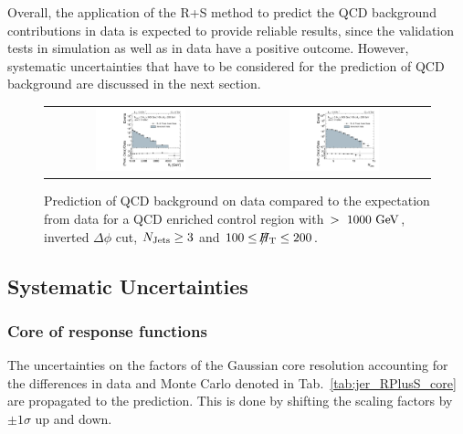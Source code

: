 Overall, the application of the R+S method to predict the QCD background contributions in data is expected to provide reliable results, since the validation tests in simulation as well as in data have a positive outcome. However, systematic uncertainties that have to be considered for the prediction of QCD background are discussed in the next section. 
\begin{figure}[!t]
  \centering
  \begin{tabular}{cc}
                \includegraphics[width=0.49\textwidth]{figures/HT_presel_HThigh_data_DR53X_chs_HThigh_invertedDeltaPhi_v1.pdf} &
                \includegraphics[width=0.49\textwidth]{figures/NJets_presel_HThigh_data_DR53X_chs_HThigh_invertedDeltaPhi_v1.pdf} \\
  \end{tabular}
  \caption{Prediction of QCD background on data compared to the expectation from data for a QCD enriched control region with \HT$>~1000~\rm{GeV}$, inverted $\Delta \phi$ cut, $N_{\text{Jets}} \geq 3$ and $100 \leq \slash\mkern-12mu{H}_{\text{T}} \leq 200$\gev.}
  \label{fig:qcd_rs_dataclosure}
\end{figure}

\subsection{Systematic Uncertainties}
\label{subsec:RA2_syst_unc}
\subsubsection*{Core of response functions} The uncertainties on the factors of the Gaussian core resolution accounting for the differences in data and Monte Carlo denoted in Tab.~\ref{tab:jer_RPlusS_core} are propagated to the prediction. This is done by shifting the scaling factors by $\pm 1\sigma$ up and down. 
